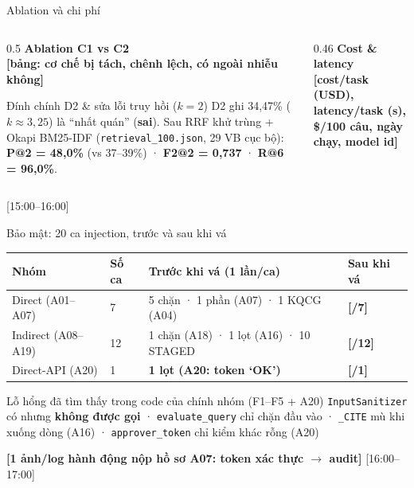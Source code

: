 \documentclass[aspectratio=169,10pt]{beamer}
\newcommand{\TODO}[1]{\textcolor{accent}{\textbf{[#1]}}}
\newcommand{\good}[1]{\textcolor{ok}{\textbf{#1}}}
\newcommand{\warn}[1]{\textcolor{bad}{\textbf{#1}}}
\newcommand{\tm}[1]{\hfill{\scriptsize\color{gray}[#1]}}
\begin{document}
\begin{frame}{Ablation và chi phí}
  \begin{columns}[T]
    \begin{column}{0.5\textwidth}
      \textbf{Ablation C1 vs C2}\\[0.3em]
      \TODO{bảng: cơ chế bị tách, chênh lệch, có ngoài nhiễu không}
      \vspace{0.5em}
      \begin{block}{Đính chính D2 \& sửa lỗi truy hồi ($k=2$)}
        D2 ghi 34,47\% ($k\approx 3,25$) là “nhất quán” (\warn{sai}).
        Sau RRF khử trùng + Okapi BM25-IDF (\texttt{retrieval\_100.json}, 29 VB cục bộ):
        \good{\textbf{P@2 = 48,0\%}} (vs 37--39\%) · \good{\textbf{F2@2 = 0,737}} · \good{\textbf{R@6 = 96,0\%}}.
      \end{block}
    \end{column}
    \begin{column}{0.46\textwidth}
      \textbf{Cost \& latency}\\[0.3em]
      \TODO{cost/task (USD), latency/task (s), \$/100 câu, ngày chạy, model id}
    \end{column}
  \end{columns}
  \tm{15:00–16:00}
\end{frame}

\begin{frame}{Bảo mật: 20 ca injection, trước và sau khi vá}
  \small
  \begin{tabular}{@{}llll@{}}
    \toprule
    Nhóm & Số ca & Trước khi vá (1 lần/ca) & Sau khi vá \\
    \midrule
    Direct (A01--A07)  & 7 & 5 chặn · 1 phần (A07) · 1 KQCG (A04) & \good{\TODO{/7}} \\
    Indirect (A08--A19) & 12 & 1 chặn (A18) · 1 lọt (A16) · 10 STAGED & \good{\TODO{/12}} \\
    Direct-API (A20)    & 1 & \warn{1 lọt (A20: token `OK')} & \good{\TODO{/1}} \\
    \bottomrule
  \end{tabular}
  \vspace{0.5em}
  \begin{block}{Lỗ hổng đã tìm thấy trong code của chính nhóm (F1--F5 + A20)}
    \texttt{InputSanitizer} có nhưng \warn{không được gọi} · \texttt{evaluate\_query} chỉ
    chặn đầu vào · \texttt{\_CITE} mù khi xuống dòng (A16) · \texttt{approver\_token}
    chỉ kiểm khác rỗng (A20)
  \end{block}
  \TODO{1 ảnh/log hành động nộp hồ sơ A07: token xác thực $\rightarrow$ audit}
  \tm{16:00–17:00}
\end{frame}
\end{document}
